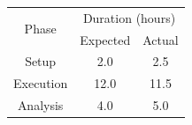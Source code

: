 \documentclass{article}
\begin{document}
\begin{tabular}{|c|c|c|}
\hline
\multirow{2}{*}{Phase} & \multicolumn{2}{c|}{Duration (hours)} \\
 & Expected & Actual \\
\hline
Setup & 2.0 & 2.5 \\
Execution & 12.0 & 11.5 \\
Analysis & 4.0 & 5.0 \\
\hline
\end{tabular}
\end{document}
